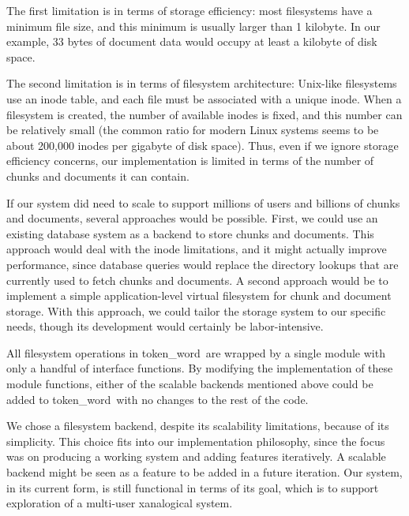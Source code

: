 \documentclass{acm_proc_article-sp}
\newcommand{\tokenWord}{token\_word}
\begin{document}
The first limitation is in terms of storage efficiency:  most filesystems have a minimum file size, and this minimum is usually larger than 1 kilobyte.
In our example, 33 bytes of document data would occupy at least a kilobyte of disk space.

The second limitation is in terms of filesystem architecture:  Unix-like filesystems use an inode table, and each file must be associated with a unique inode.
When a filesystem is created, the number of available inodes is fixed, and this number can be relatively small (the common ratio for modern Linux systems seems to be about 200,000 inodes per gigabyte of disk space). \cite{OperatingSystems}
Thus, even if we ignore storage efficiency concerns, our implementation is limited in terms of the number of chunks and documents it can contain.

If our system did need to scale to support millions of users and billions of chunks and documents, several approaches would be possible.
First, we could use an existing database system as a backend to store chunks and documents.
This approach would deal with the inode limitations, and it might actually improve performance, since database queries would replace the directory lookups that are currently used to fetch chunks and documents.
A second approach would be to implement a simple application-level virtual filesystem for chunk and document storage.
With this approach, we could tailor the storage system to our specific needs, though its development would certainly be labor-intensive.

All filesystem operations in \tokenWord \  are wrapped by a single module with only a handful of interface functions.
By modifying the implementation of these module functions, either of the scalable backends mentioned above could be added to \tokenWord \  with no changes to the rest of the code. 

We chose a filesystem backend, despite its scalability limitations, because of its simplicity.
This choice fits into our implementation philosophy, since the focus was on producing a working system and adding features iteratively.
A scalable backend might be seen as a feature to be added in a future iteration.
Our system, in its current form, is still functional in terms of its goal, which is to support exploration of a multi-user xanalogical system.

\end{document}
